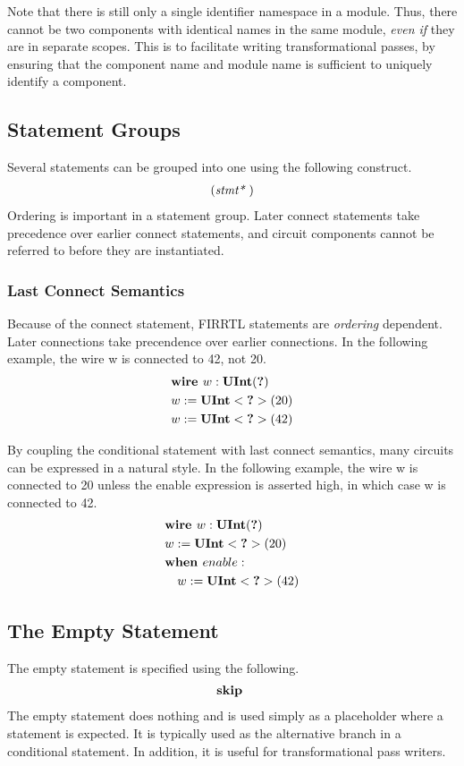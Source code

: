 \documentclass[12pt]{article}
\begin{document}
Note that there is still only a single identifier namespace in a module.
Thus, there cannot be two components with identical names in the same module, {\em even if} they are in separate scopes.
This is to facilitate writing transformational passes, by ensuring that the component name and module name is sufficient to uniquely identify a component.

\subsection{Statement Groups}
Several statements can be grouped into one using the following construct.
\[
\begin{aligned}
(\text{\em stmt*\ })
\end{aligned}
\]
Ordering is important in a statement group.
Later connect statements take precedence over earlier connect statements, and circuit components cannot be referred to before they are instantiated.

\subsubsection{Last Connect Semantics}
Because of the connect statement, FIRRTL statements are {\em ordering} dependent.
Later connections take precendence over earlier connections.
In the following example, the wire w is connected to 42, not 20. 
\[
\begin{aligned}
&\text{\bf wire\ } w : \text{\bf UInt}(\text{\bf ?}) \\
&w := \text{\bf UInt}<\text{\bf ?}>(20) \\
&w := \text{\bf UInt}<\text{\bf ?}>(42) \\
\end{aligned}
\]

By coupling the conditional statement with last connect semantics, many circuits can be expressed in a natural style.
In the following example, the wire w is connected to 20 unless the enable expression is asserted high, in which case w is connected to 42. 
\[
\begin{aligned}
&\text{\bf wire\ } w : \text{\bf UInt}(\text{\bf ?}) \\
&w := \text{\bf UInt}<\text{\bf ?}>(20) \\
&\text{\bf when\ } enable : \\
&\quad w := \text{\bf UInt}<\text{\bf ?}>(42) \\
\end{aligned}
\]

\subsection{The Empty Statement}
The empty statement is specified using the following.
\[
\begin{aligned}
\text{\bf skip\ }
\end{aligned}
\]
The empty statement does nothing and is used simply as a placeholder where a statement is expected.
It is typically used as the alternative branch in a conditional statement. 
In addition, it is useful for transformational pass writers.
\end{document}
